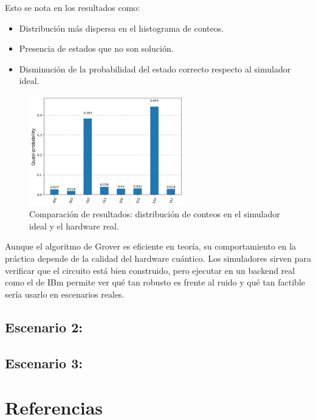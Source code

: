 \documentclass{article}
\begin{document}
Esto se nota en los resultados como:

\begin{itemize}
    \item Distribución más dispersa en el histograma de conteos.
    \item Presencia de estados que no son solución.
    \item Disminución de la probabilidad del estado 
            correcto respecto al simulador ideal.
\end{itemize}

\begin{figure}[H]
    \centering
    \includegraphics[width=0.6\textwidth]{hist1.png}
    \caption{Comparación de resultados: distribución de conteos en el 
            simulador ideal y el hardware real.}
    \label{fig:grover_histogram}
\end{figure}

Aunque el algoritmo de Grover es eficiente en teoría, su comportamiento en la 
práctica depende de la calidad del hardware cuántico. Los simuladores sirven 
para verificar que el circuito está bien construido, pero ejecutar en un backend 
real como el de IBm permite ver qué tan robusto es frente al ruido y qué tan 
factible sería usarlo 
en escenarios reales.


\subsection{Escenario 2: }
 
\subsection{Escenario 3: }



\section{Referencias}
\renewcommand{\refname}{}
\end{document}
